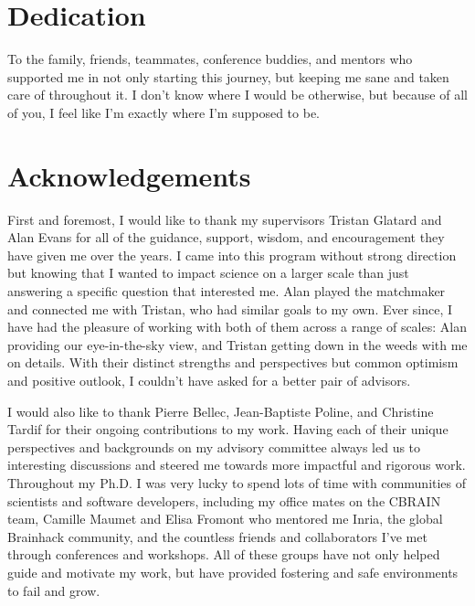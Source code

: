\documentclass[fleqn,12pt]{SelfArx} %
\affiliation{\textit{Biological \& Biomedical Engineering, McGill University, Montréal, QC, Canada}}
\begin{document}
\flushbottom %
\makethesistitle %
\onecolumn

\beginfront
\clearpage
{}
\section{Dedication}
To the family, friends, teammates, conference buddies, and mentors who supported me in not only starting this journey,
but keeping me sane and taken care of throughout it. I don't know where I would be otherwise, but because of all of
you, I feel like I'm exactly where I'm supposed to be.
\clearpage

\section{Acknowledgements}
First and foremost, I would like to thank my supervisors Tristan Glatard and Alan Evans for all of the guidance,
support, wisdom, and encouragement they have given me over the years. I came into this program without strong direction
but knowing that I wanted to impact science on a larger scale than just answering a specific question that interested
me. Alan played the matchmaker and connected me with Tristan, who had similar goals to my own. Ever since, I have had
the pleasure of working with both of them across a range of scales: Alan providing our eye-in-the-sky view, and Tristan
getting down in the weeds with me on details. With their distinct strengths and perspectives but common optimism and
positive outlook, I couldn't have asked for a better pair of advisors.

I would also like to thank Pierre Bellec, Jean-Baptiste Poline, and Christine Tardif for their ongoing contributions to
my work. Having each of their unique perspectives and backgrounds on my advisory committee always led us to interesting
discussions and steered me towards more impactful and rigorous work. Throughout my Ph.D. I was very lucky to spend lots
of time with communities of scientists and software developers, including my office mates on the CBRAIN team, Camille
Maumet and Elisa Fromont who mentored me Inria, the global Brainhack community, and the countless friends and
collaborators I've met through conferences and workshops. All of these groups have not only helped guide and motivate
my work, but have provided fostering and safe environments to fail and grow.
\end{document}
